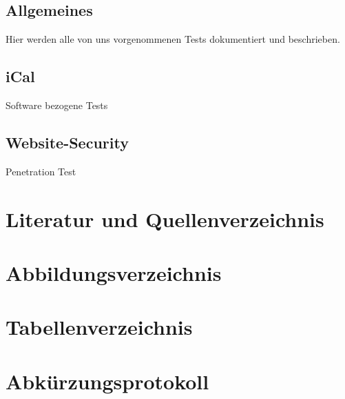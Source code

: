 \documentclass[11pt]{scrartcl}
\begin{document}
\subsection{Allgemeines}
Hier werden alle von uns vorgenommenen Tests dokumentiert und beschrieben.

\subsection{iCal}
Software bezogene Tests

\subsection{Website-Security}
Penetration Test

\section{Literatur und Quellenverzeichnis}
\label{sec:literatur-quellenverzeichnis}

\section{Abbildungsverzeichnis}
\label{sec:abbildungsverzeichnis}

\section{Tabellenverzeichnis}
\label{sec:tabellenverzeichnis}

\section{Abkürzungsprotokoll}
\label{sec:abkuerzungsprotokoll}
\end{document}
